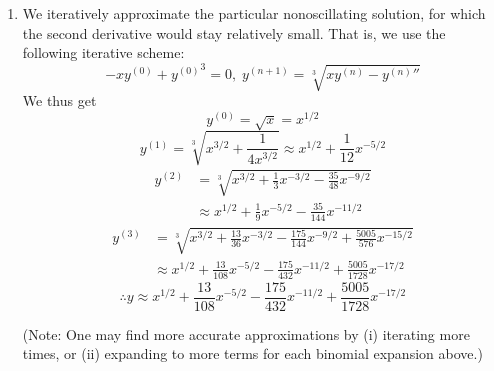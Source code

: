 \begin{enumerate}[wide, labelindent=0pt, label= (\alph*)]
	\item
	      We iteratively approximate the particular nonoscillating solution, for which the second derivative would stay relatively small.
	      That is, we use the following iterative scheme:
	      \[
		      -xy^{(0)} + {y^{(0)}}^3 = 0,\;
		      y^{(n + 1)} = \sqrt[3]{xy^{(n)} - {y^{(n)}}''}
	      \]
	      We thus get
	      \[
		      y^{(0)} = \sqrt{x} = x^{1/2}
	      \]
	      \[
		      y^{(1)}
		      = \sqrt[3]{x^{3/2} + \frac{1}{4x^{3/2}}}
		      \approx x^{1/2} + \frac{1}{12} x^{-5/2}
	      \]
	      \begin{align*}
		      y^{(2)}
		       & = \sqrt[3]{x^{3/2} + \frac{1}{3}x^{-3/2} - \frac{35}{48}x^{-9/2}} \\
		       & \approx x^{1/2} + \frac{1}{9}x^{-5/2} - \frac{35}{144}x^{-11/2}
	      \end{align*}
	      \begin{align*}
		      y^{(3)}
		       & = \sqrt[3]{x^{3/2} + \frac{13}{36}x^{-3/2} - \frac{175}{144}x^{-9/2} + \frac{5005}{576}x^{-15/2}} \\
		       & \approx x^{1/2} + \frac{13}{108}x^{-5/2} - \frac{175}{432}x^{-11/2} + \frac{5005}{1728}x^{-17/2}
	      \end{align*}
	      \[
		      \therefore y \approx x^{1/2} + \frac{13}{108}x^{-5/2} - \frac{175}{432}x^{-11/2} + \frac{5005}{1728}x^{-17/2}
	      \]

	      (Note: One may find more accurate approximations by (i) iterating more times, or (ii) expanding to more terms for each binomial expansion above.)

\end{enumerate}